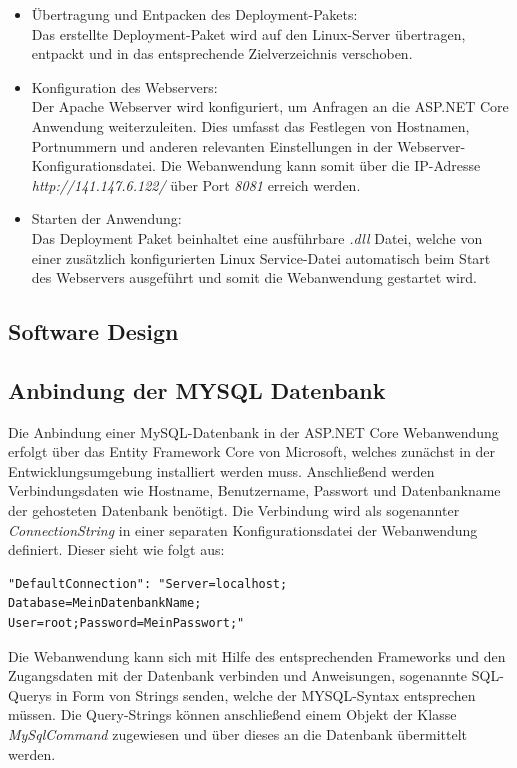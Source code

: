 \documentclass[conference]{IEEEtran}
\begin{document}
\begin{itemize}
	\item Übertragung und Entpacken des Deployment-Pakets: \\
	Das erstellte Deployment-Paket wird auf den Linux-Server übertragen, entpackt und in das entsprechende Zielverzeichnis verschoben.
	\item Konfiguration des Webservers: \\
	Der Apache Webserver wird konfiguriert, um Anfragen an die ASP.NET Core Anwendung weiterzuleiten. Dies umfasst das Festlegen von Hostnamen, Portnummern und anderen relevanten Einstellungen in der Webserver-Konfigurationsdatei. Die Webanwendung kann somit über die IP-Adresse \textit{http://141.147.6.122/} über Port \textit{8081} erreich werden.
	\item Starten der Anwendung: \\
	Das Deployment Paket beinhaltet eine ausführbare \textit{.dll} Datei, welche von einer zusätzlich konfigurierten Linux Service-Datei automatisch beim Start des Webservers ausgeführt und somit die Webanwendung gestartet wird.
\end{itemize}
\subsection{Software Design}
\subsection{Anbindung der MYSQL Datenbank}
Die Anbindung einer MySQL-Datenbank in der ASP.NET Core Webanwendung erfolgt über das Entity Framework Core von Microsoft, welches zunächst in der Entwicklungsumgebung installiert werden muss. Anschließend werden Verbindungsdaten wie Hostname, Benutzername, Passwort und Datenbankname der gehosteten Datenbank benötigt. Die Verbindung wird als sogenannter \textit{ConnectionString} in einer separaten Konfigurationsdatei der Webanwendung definiert. Dieser sieht wie folgt aus: \\
\begin{verbatim}
"DefaultConnection": "Server=localhost;
Database=MeinDatenbankName;
User=root;Password=MeinPasswort;"
\end{verbatim}
Die Webanwendung kann sich mit Hilfe des entsprechenden Frameworks und den Zugangsdaten mit der Datenbank verbinden und Anweisungen, sogenannte SQL-Querys in Form von Strings senden, welche der MYSQL-Syntax entsprechen müssen. Die Query-Strings können anschließend einem Objekt der Klasse \textit{MySqlCommand} zugewiesen und über dieses an die Datenbank übermittelt werden.
\end{document}
